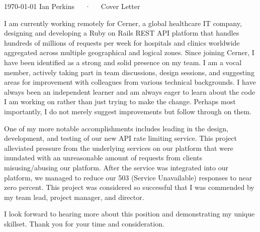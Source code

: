 \documentclass[11pt, a4paper]{awesome-cv}
\begin{document}
\makecvheader[C]

\makecvfooter
  {\today}
  {Ian Perkins~~~·~~~Cover Letter}
  {}

\makelettertitle

\begin{cvletter}

I am currently working remotely for Cerner, a global healthcare IT company, designing and developing a Ruby on Rails REST API platform that handles hundreds of millions of requests per week for hospitals and clinics worldwide aggregated across multiple geographical and logical zones. Since joining Cerner, I have been identified as a strong and solid presence on my team. I am a vocal member, actively taking part in team discussions, design sessions, and suggesting areas for improvement with colleagues from various technical backgrounds. I have always been an independent learner and am always eager to learn about the code I am working on rather than just trying to make the change. Perhaps most importantly, I do not merely suggest improvements but follow through on them.

One of my more notable accomplishments includes leading in the design, development, and testing of our new API rate limiting service. This project alleviated pressure from the underlying services on our platform that were inundated with an unreasonable amount of requests from clients misusing/abusing our platform. After the service was integrated into our platform, we managed to reduce our 503 (Service Unavailable) responses to near zero percent. This project was considered so successful that I was commended by my team lead, project manager, and director.

I look forward to hearing more about this position and demonstrating my unique skillset. Thank you for your time and consideration.



\end{cvletter}
\end{document}
